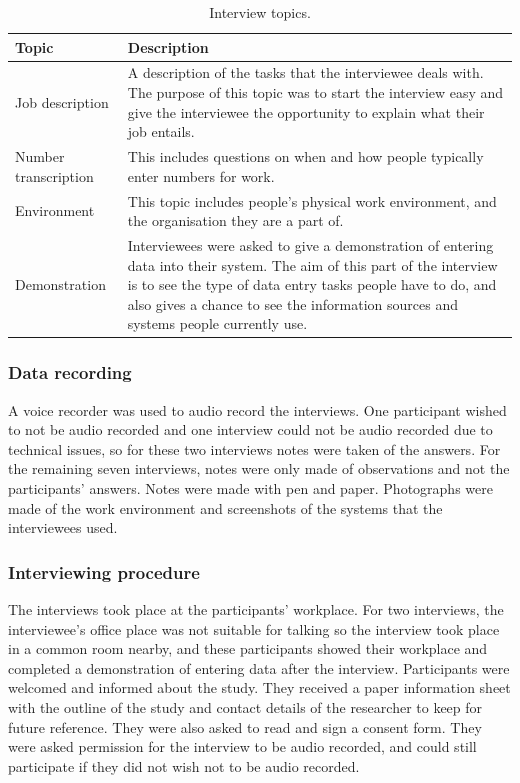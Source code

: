 \begin{table}[htp]
\centering
    \begin{tabular}{ | l | p{10cm} |}
    \hline
     Topic & Description \\ \hline
    Job description & A description of the tasks that the interviewee deals with. The purpose of this topic was to start the interview easy and give the interviewee the opportunity to explain what their job entails. \\ \hline
    Number transcription & This includes questions on when and how people typically enter numbers for work.  \\ \hline
Environment & This topic includes people's physical work environment, and the organisation they are a part of. \\ \hline
Demonstration &  Interviewees were asked to give a demonstration of entering data into their system. The aim of this part of the interview is to see the type of data entry tasks people have to do, and also gives a chance to see the information sources and systems people currently use. \\
    \hline
    \end{tabular}
    \caption[Study 1 interview topics]{Interview topics.}
    \label{table:ch3_interviewtopics}
\end{table}%

\subsubsection{Data recording}
A voice recorder was used to audio record the interviews. One participant wished to not be audio recorded and one interview could not be audio recorded due to technical issues, so for these two interviews notes were taken of the answers. For the remaining seven interviews, notes were only made of observations and not the participants' answers. Notes were made with pen and paper. Photographs were made of the work environment and screenshots of the systems that the interviewees used.

\subsubsection{Interviewing procedure}
The interviews took place at the participants' workplace. For two interviews, the interviewee's office place was not suitable for talking so the interview took place in a common room nearby, and these participants showed their workplace and completed a demonstration of entering data after the interview. Participants were welcomed and informed about the study. They received a paper information sheet with the outline of the study and contact details of the researcher to keep for future reference. They were also asked to read and sign a consent form. They were asked permission for the interview to be audio recorded, and could still participate if they did not wish not to be audio recorded. 

